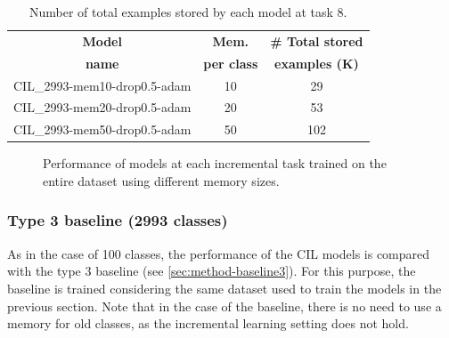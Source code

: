 \begin{table}[H]
    \centering
    \begin{tabular}{c|c|c}
        \hline
        \textbf{Model} &
        \textbf{Mem.} &
        \textbf{\# Total stored} \\
        \textbf{name} &
        \textbf{per class} &
        \textbf{examples (K)} \\
        \hline
        \hline
CIL\_2993-mem10-drop0.5-adam&10&29\\
CIL\_2993-mem20-drop0.5-adam&20&53\\
CIL\_2993-mem50-drop0.5-adam&50&102\\
        \hline
    \end{tabular}
    \caption{Number of total examples stored by each model at task 8.}
    \label{table:exp6-memsize}
\end{table}


\begin{figure}[H]
	\centering
	\caption{Performance of models at each incremental task trained on the entire dataset using different memory sizes.}%
	\label{fig:exp6}%
\end{figure}


\subsubsection{Type 3 baseline (2993 classes)}
As in the case of 100 classes, the performance of the CIL models is compared with the type 3 baseline (see \autoref{sec:method-baseline3}).
For this purpose, the baseline is trained considering the same dataset used to train the models in the previous section.
Note that in the case of the baseline, there is no need to use a memory for old classes, as the incremental learning setting does not hold.
 

